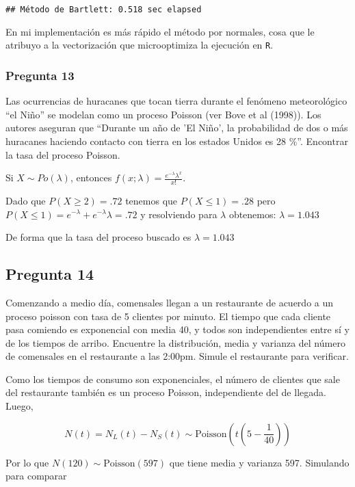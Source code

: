 \documentclass[]{article}
\begin{document}
\begin{verbatim}
## Método de Bartlett: 0.518 sec elapsed
\end{verbatim}

En mi implementación es más rápido el método por normales, cosa que le
atribuyo a la vectorización que microoptimiza la ejecución en
\texttt{R}.

\hypertarget{pregunta-13}{%
\subsubsection{Pregunta 13}\label{pregunta-13}}

Las ocurrencias de huracanes que tocan tierra durante el fenómeno
meteorológico ``el Niño'' se modelan como un proceso Poisson (ver Bove
et al (1998)). Los autores aseguran que ``Durante un año de 'El Niño',
la probabilidad de dos o más huracanes haciendo contacto con tierra en
los estados Unidos es 28 \%''. Encontrar la tasa del proceso Poisson.

Si \(X \sim Po(\lambda)\), entonces
\(f(x;\lambda) = \frac{e^{-\lambda}\lambda^x}{x!}\).

Dado que \(P(X \geq 2) = .72\) tenemos que \(P(X \leq 1) = .28\) pero
\(P(X \leq 1) = e^{-\lambda} +e^{-\lambda}\lambda = .72\) y resolviendo
para \(\lambda\) obtenemos: \(\lambda = 1.043\)

De forma que la tasa del proceso buscado es \(\lambda = 1.043\)

\hypertarget{pregunta-14}{%
\subsection{Pregunta 14}\label{pregunta-14}}

Comenzando a medio día, comensales llegan a un restaurante de acuerdo a
un proceso poisson con tasa de 5 clientes por minuto. El tiempo que cada
cliente pasa comiendo es exponencial con media 40, y todos son
independientes entre sí y de los tiempos de arribo. Encuentre la
distribución, media y varianza del número de comensales en el
restaurante a las 2:00pm. Simule el restaurante para verificar.

Como los tiempos de consumo son exponenciales, el número de clientes que
sale del restaurante también es un proceso Poisson, independiente del de
llegada. Luego,

\[
N(t) = N_L(t)-N_S(t) \sim \mathrm{Poisson}(t(5-\frac{1}{40}))
\]

Por lo que \(N(120) \sim \mathrm{Poisson}(597)\) que tiene media y
varianza 597. Simulando para comparar
\end{document}
